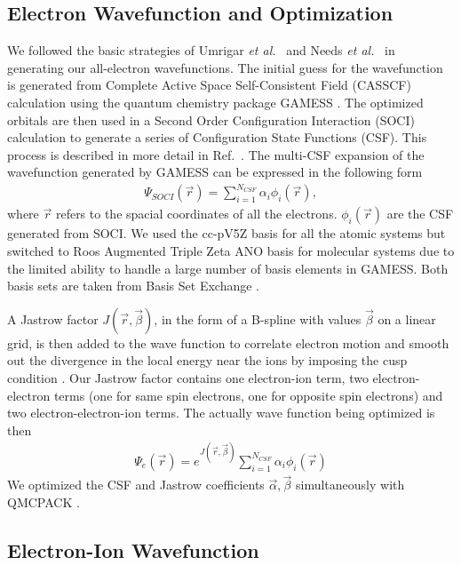 \documentclass[pra,superscriptaddress,groupedaddress,twocolumn]{revtex4}
\begin{document}
\subsection{Electron Wavefunction and Optimization}
We followed the basic strategies of Umrigar {\it et al.}~\cite{Umrigar_Alleviation,Toulouse_Bench} and Needs {\it et al.}~\cite{Brown_Bench,Seth_Bench} in generating our all-electron wavefunctions. The initial guess for the wavefunction is generated from Complete Active Space Self-Consistent Field (CASSCF) \cite{Chaban_MCSCF,Szabo} calculation using the quantum chemistry package GAMESS \cite{GAMESS}. The optimized orbitals are then used in a Second Order Configuration Interaction (SOCI) calculation to generate a series of Configuration State Functions (CSF). This process is described in more detail in Ref.~\cite{Clark_Bench}. The multi-CSF expansion of the wavefunction generated by GAMESS can be expressed in the following form
\begin{align}
\Psi_{SOCI}(\vec{r})=\sum\limits_{i=1}^{N_{CSF}}\alpha_i\phi_i(\vec{r}), \label{eq:psi_gms}
\end{align}
where $\vec{r}$ refers to the spacial coordinates of all the electrons. $\phi_i(\vec{r})$ are the CSF generated from SOCI. We used the cc-pV5Z basis for all the atomic systems but switched to Roos Augmented Triple Zeta ANO basis for molecular systems due to the limited ability to handle a large number of basis elements in GAMESS. Both basis sets are taken from Basis Set Exchange \cite{BSE}.

A Jastrow factor $J(\vec{r},\vec{\beta})$, in the form of a B-spline with values $\vec{\beta}$ on a linear grid, is then added to the wave function to correlate electron motion and smooth out the divergence in the local energy near the ions by imposing the cusp condition \cite{Kato}. Our Jastrow factor contains one electron-ion term, two electron-electron terms (one for same spin electrons, one for opposite spin electrons) and two electron-electron-ion terms. The actually wave function being optimized is then
\begin{align}
\Psi_e(\vec{r})=e^{J(\vec{r},\vec{\beta})}\sum\limits_{i=1}^{N_{CSF}}\alpha_i\phi_i(\vec{r})\label{eq:psie}
\end{align}
We optimized the CSF and Jastrow coefficients $\vec{\alpha},\vec{\beta}$ simultaneously with QMCPACK \cite{QMCPACK}.

\subsection{Electron-Ion Wavefunction}
\end{document}
